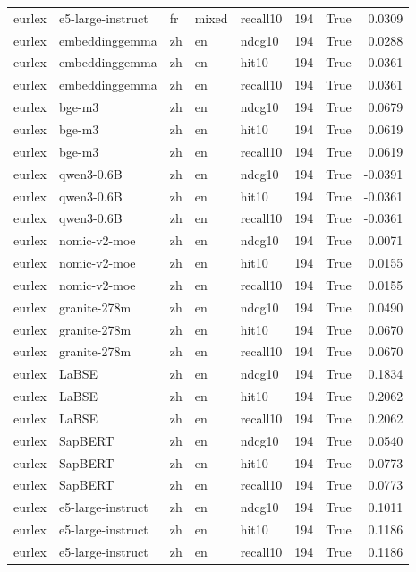 \begin{tabular}{lllllrrr}
eurlex & e5-large-instruct & fr & mixed & recall10 & 194 & True & 0.0309 \\
eurlex & embeddinggemma & zh & en & ndcg10 & 194 & True & 0.0288 \\
eurlex & embeddinggemma & zh & en & hit10 & 194 & True & 0.0361 \\
eurlex & embeddinggemma & zh & en & recall10 & 194 & True & 0.0361 \\
eurlex & bge-m3 & zh & en & ndcg10 & 194 & True & 0.0679 \\
eurlex & bge-m3 & zh & en & hit10 & 194 & True & 0.0619 \\
eurlex & bge-m3 & zh & en & recall10 & 194 & True & 0.0619 \\
eurlex & qwen3-0.6B & zh & en & ndcg10 & 194 & True & -0.0391 \\
eurlex & qwen3-0.6B & zh & en & hit10 & 194 & True & -0.0361 \\
eurlex & qwen3-0.6B & zh & en & recall10 & 194 & True & -0.0361 \\
eurlex & nomic-v2-moe & zh & en & ndcg10 & 194 & True & 0.0071 \\
eurlex & nomic-v2-moe & zh & en & hit10 & 194 & True & 0.0155 \\
eurlex & nomic-v2-moe & zh & en & recall10 & 194 & True & 0.0155 \\
eurlex & granite-278m & zh & en & ndcg10 & 194 & True & 0.0490 \\
eurlex & granite-278m & zh & en & hit10 & 194 & True & 0.0670 \\
eurlex & granite-278m & zh & en & recall10 & 194 & True & 0.0670 \\
eurlex & LaBSE & zh & en & ndcg10 & 194 & True & 0.1834 \\
eurlex & LaBSE & zh & en & hit10 & 194 & True & 0.2062 \\
eurlex & LaBSE & zh & en & recall10 & 194 & True & 0.2062 \\
eurlex & SapBERT & zh & en & ndcg10 & 194 & True & 0.0540 \\
eurlex & SapBERT & zh & en & hit10 & 194 & True & 0.0773 \\
eurlex & SapBERT & zh & en & recall10 & 194 & True & 0.0773 \\
eurlex & e5-large-instruct & zh & en & ndcg10 & 194 & True & 0.1011 \\
eurlex & e5-large-instruct & zh & en & hit10 & 194 & True & 0.1186 \\
eurlex & e5-large-instruct & zh & en & recall10 & 194 & True & 0.1186 \\

\end{tabular}
